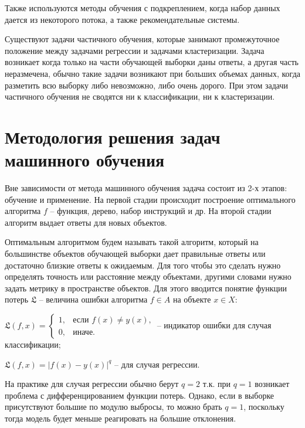 Также используются методы обучения с подкреплением, когда набор данных дается из некоторого потока, а также рекомендательные системы.

Существуют задачи частичного обучения, которые занимают промежуточное положение между задачами регрессии и задачами кластеризации. Задача возникает когда только на части обучающей выборки даны ответы, а другая часть неразмечена, обычно такие задачи возникают при больших объемах данных, когда разметить всю выборку либо невозможно, либо очень дорого. При этом задачи частичного обучения не сводятся ни к классификации, ни к кластеризации.



\section{Методология решения задач машинного обучения}

Вне зависимости от метода машинного обучения задача состоит из 2-х этапов: обучение и применение.
На первой стадии происходит построение оптимального алгоритма $f$ -- функция, дерево, набор инструкций и др. На второй стадии алгоритм выдает ответы для новых объектов.

Оптимальным алгоритмом будем называть такой алгоритм, который на большинстве объектов обучающей выборки дает правильные ответы или достаточно близкие ответы к ожидаемым. Для того чтобы это сделать нужно определять точность или расстояние между объектами, другими словами нужно задать метрику в пространстве объектов. Для этого вводится понятие функции потерь $\mathfrak{L}$ -- величина ошибки алгоритма $f \in A$ на объекте $x \in X$:
\begin{description}[font=$\bullet$]
    \item $\mathfrak{L} (f,x)=
    \begin{cases}
        1, &\text{если $f(x) \neq y(x)$,}\\
        0, &\text{иначе.}
    \end{cases}
    $ -- индикатор ошибки для случая классификации;
    \item $\mathfrak{L} (f,x)= |f(x) - y(x)|^q$ -- для случая регрессии.
\end{description}


На практике для случая регрессии обычно берут $q=2$ т.к. при $q=1$ возникает проблема с дифференцированием функции потерь. Однако, если в выборке присутствуют большие по модулю выбросы, то можно брать $q=1$, поскольку тогда модель будет меньше реагировать на большие отклонения.

